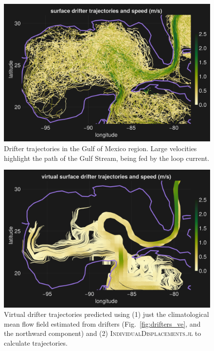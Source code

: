 \documentclass{juliacon}[12pt]
\newcommand{\pkg}[1]{{\small \textsc{#1}}}
\begin{document}
\begin{figure}[t]
\centerline{\includegraphics[width=\columnwidth]{figs/20240528_speed_subset.png}}
\caption{Drifter trajectories in the Gulf of Mexico region. Large velocities highlight the path of the Gulf Stream, being fed by the loop current.}
\label{fig:drifters_speed}
\end{figure}

\begin{figure}[t]
\centerline{\includegraphics[width=\columnwidth]{figs/20240529_speed_subset_IndDisp.png}}
\caption{Virtual drifter trajectories predicted using (1) just the climatological mean flow field estimated from drifters (Fig.~\ref{fig:drifters_ve}, and the northward component) and (2) \pkg{IndividualDisplacements.jl} to calculate trajectories.}
\label{fig:drifters_speed_simu}
\end{figure}
\end{document}

